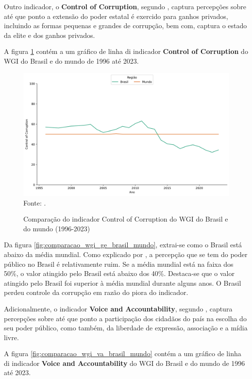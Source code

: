 Outro indicador, o \textbf{Control of Corruption}, segundo \cite{kaufmann2024worldwide}, captura percepções sobre até que ponto a extensão do poder estatal é exercido para ganhos privados, incluindo as formas pequenas e grandes de corrupção, bem com, captura o estado da elite e dos ganhos privados.

A figura \ref{fig:comparacao_wgi_cc_brasil_mundo} contém a um gráfico de linha di indicador \textbf{Control of Corruption} do WGI do Brasil e do mundo de 1996 até 2023.

\begin{figure}[H]
	\centering
	\caption{Comparação do indicador Control of Corruption do WGI do Brasil e do mundo (1996-2023)}
	\includegraphics[width=1\linewidth]{figuras/comparacao_wgi_cc_brasil_mundo}
	\label{fig:comparacao_wgi_cc_brasil_mundo}
	\footnotesize{Fonte: \cite{wgi_dados}.}
\end{figure}

Da figura \ref{fig:comparacao_wgi_ge_brasil_mundo}, extrai-se como o Brasil está abaixo da média mundial. Como explicado por \cite{kaufmann2024worldwide}, a percepção que se tem do poder público no Brasil é relativamente ruim. Se a média mundial está na faixa dos 50\%, o valor atingido pelo Brasil está abaixo dos 40\%. Destaca-se que o valor atingido pelo Brasil foi superior à média mundial durante alguns anos. O Brasil perdeu controle da corrupção em razão do piora do indicador.

Adicionalmente, o indicador \textbf{Voice and Accountability}, segundo  \cite{kaufmann2024worldwide}, captura percepções sobre até que ponto a participação dos cidadãos do país na escolha do seu poder público, como também, da liberdade de expressão, associação e a mídia livre.

A figura \ref{fig:comparacao_wgi_va_brasil_mundo} contém a um gráfico de linha di indicador \textbf{Voice and Accountability} do WGI do Brasil e do mundo de 1996 até 2023.

